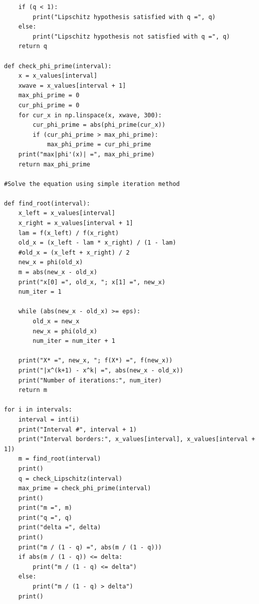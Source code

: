 \documentclass[14pt, a4paper]{article}
\begin{document}
\begin{lstlisting}
    if (q < 1):
        print("Lipschitz hypothesis satisfied with q =", q)
    else:
        print("Lipschitz hypothesis not satisfied with q =", q)
    return q
        
def check_phi_prime(interval):
    x = x_values[interval]
    xwave = x_values[interval + 1]
    max_phi_prime = 0
    cur_phi_prime = 0
    for cur_x in np.linspace(x, xwave, 300):
        cur_phi_prime = abs(phi_prime(cur_x))
        if (cur_phi_prime > max_phi_prime):
            max_phi_prime = cur_phi_prime
    print("max|phi'(x)| =", max_phi_prime)
    return max_phi_prime

#Solve the equation using simple iteration method

def find_root(interval):
    x_left = x_values[interval]
    x_right = x_values[interval + 1]
    lam = f(x_left) / f(x_right)
    old_x = (x_left - lam * x_right) / (1 - lam)
    #old_x = (x_left + x_right) / 2
    new_x = phi(old_x)
    m = abs(new_x - old_x)
    print("x[0] =", old_x, "; x[1] =", new_x)
    num_iter = 1

    while (abs(new_x - old_x) >= eps):
        old_x = new_x
        new_x = phi(old_x)
        num_iter = num_iter + 1

    print("X* =", new_x, "; f(X*) =", f(new_x))
    print("|x^(k+1) - x^k| =", abs(new_x - old_x))
    print("Number of iterations:", num_iter)
    return m

for i in intervals:
    interval = int(i)
    print("Interval #", interval + 1)
    print("Interval borders:", x_values[interval], x_values[interval + 1])
    m = find_root(interval)
    print()
    q = check_Lipschitz(interval)
    max_prime = check_phi_prime(interval)
    print()
    print("m =", m)
    print("q =", q)
    print("delta =", delta)
    print()
    print("m / (1 - q) =", abs(m / (1 - q)))
    if abs(m / (1 - q)) <= delta:
        print("m / (1 - q) <= delta")
    else:
        print("m / (1 - q) > delta")
    print()

\end{lstlisting}
\end{document}
